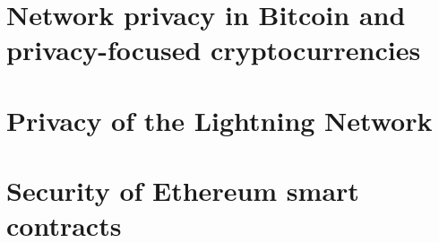 \documentclass[
11pt, %
english, %
singlespacing, %
headsepline, %
]{MastersDoctoralThesis} %
\author{Sergei \textsc{Tikhomirov}} %
\begin{document}



\mainmatter %

\pagestyle{thesis} %




\part{Network privacy in Bitcoin and privacy-focused cryptocurrencies}
\label{Part1Privacy}




\part{Privacy of the Lightning Network}
\label{Part2Lightning}





\part{Security of Ethereum smart contracts}
\label{Part3Ethereum}







\appendix %


%
%
%

\printbibliography[heading=bibintoc]
\setcounter{secnumdepth}{-1}

\end{document}
